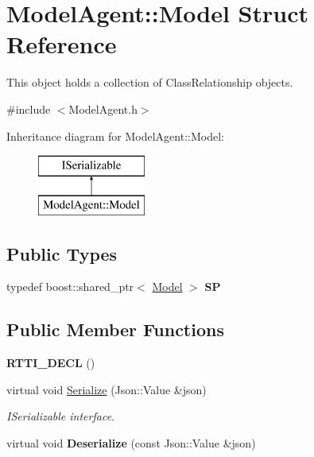 \hypertarget{struct_model_agent_1_1_model}{}\section{Model\+Agent\+:\+:Model Struct Reference}
\label{struct_model_agent_1_1_model}


This object holds a collection of Class\+Relationship objects.  




{\ttfamily \#include $<$Model\+Agent.\+h$>$}

Inheritance diagram for Model\+Agent\+:\+:Model\+:\begin{figure}[H]
\begin{center}
\leavevmode
\includegraphics[height=2.000000cm]{struct_model_agent_1_1_model}
\end{center}
\end{figure}
\subsection*{Public Types}
\begin{DoxyCompactItemize}
\item 
\mbox{\label{struct_model_agent_1_1_model_aaf9312a01a775de46db308ca7a5e9111}} 
typedef boost\+::shared\+\_\+ptr$<$ \hyperlink{struct_model_agent_1_1_model}{Model} $>$ {\bfseries SP}
\end{DoxyCompactItemize}
\subsection*{Public Member Functions}
\begin{DoxyCompactItemize}
\item 
\mbox{\label{struct_model_agent_1_1_model_a1315485e249df167dbae60ee05d65bb5}} 
{\bfseries R\+T\+T\+I\+\_\+\+D\+E\+CL} ()
\item 
\mbox{\label{struct_model_agent_1_1_model_ac7571f1926d22409fda2a3017eb9ebd2}} 
virtual void \hyperlink{struct_model_agent_1_1_model_ac7571f1926d22409fda2a3017eb9ebd2}{Serialize} (Json\+::\+Value \&json)
\begin{DoxyCompactList}\small\item\em I\+Serializable interface. \end{DoxyCompactList}\item 
\mbox{\label{struct_model_agent_1_1_model_a4cfb10031a1265db0ce1694c08ac1be9}} 
virtual void {\bfseries Deserialize} (const Json\+::\+Value \&json)
\end{DoxyCompactItemize}
